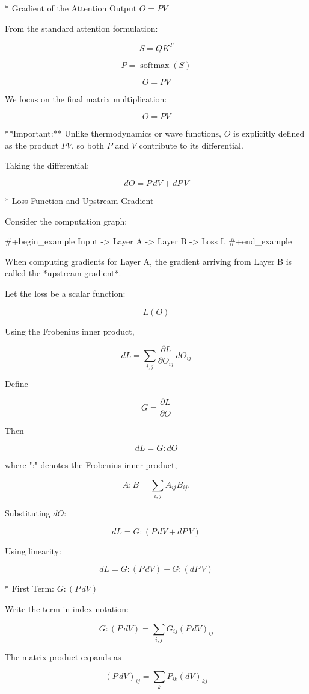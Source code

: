 * Gradient of the Attention Output \(O = PV\)

From the standard attention formulation:

\[
S = QK^T
\]

\[
P = \operatorname{softmax}(S)
\]

\[
O = PV
\]

We focus on the final matrix multiplication:

\[
O = PV
\]

**Important:** Unlike thermodynamics or wave functions, \(O\) is explicitly defined as the product \(PV\), so both \(P\) and \(V\) contribute to its differential.

Taking the differential:

\[
dO = P\,dV + dP\,V
\]

* Loss Function and Upstream Gradient

Consider the computation graph:

#+begin_example
Input -> Layer A -> Layer B -> Loss L
#+end_example

When computing gradients for Layer A, the gradient arriving from Layer B is called the *upstream gradient*.

Let the loss be a scalar function:

\[
L(O)
\]

Using the Frobenius inner product,

\[
dL = \sum_{i,j} \frac{\partial L}{\partial O_{ij}}\, dO_{ij}
\]

Define

\[
G = \frac{\partial L}{\partial O}
\]

Then

\[
dL = G : dO
\]

where ":" denotes the Frobenius inner product,

\[
A:B = \sum_{i,j} A_{ij}B_{ij}.
\]

Substituting \(dO\):

\[
dL = G : (P\,dV + dP\,V)
\]

Using linearity:

\[
dL = G:(P\,dV) + G:(dP\,V)
\]

* First Term: \(G:(P\,dV)\)

Write the term in index notation:

\[
G:(P\,dV)
=
\sum_{i,j}
G_{ij}(P\,dV)_{ij}
\]

The matrix product expands as

\[
(P\,dV)_{ij}
=
\sum_k P_{ik}(dV)_{kj}
\]


